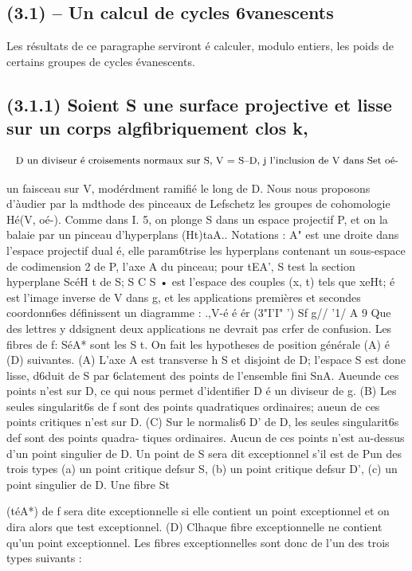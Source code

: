 \documentclass[11pt]{article}
\theoremstyle{remark}
\begin{document}
\subsection*{(3.1) -- Un calcul de cycles 6vanescents}

Les résultats de ce paragraphe serviront é calculer, modulo entiers, les poids de certains groupes de cycles évanescents.

\subsection*{(3.1.1) Soient S une surface projective et lisse sur un corps algfibriquement clos k,}

\[\text{\small D un diviseur é croisements normaux sur S, V = S--D, j l'inclusion de V dans Set oé-}\]

un faisceau sur V, modérdment ramifié le long de D. Nous nous proposons d'àudier par la mdthode des pinceaux de Lefschetz les groupes de cohomologie Hé(V, oé-). Comme dans I. 5, on plonge S dans un espace projectif P, et on la balaie par un pinceau d'hyperplans (Ht)taA.. Notations : A" est une droite dans l'espace projectif dual é, elle param6trise les hyperplans contenant un sous-espace de codimension 2 de P, l'axe A du pinceau; pour tEA', S test la section hyperplane ScéH t de S; S C S • est l'espace des couples (x, t) tels que xeHt; é est l'image inverse de V dans g, et les applications premières et secondes coordonn6es définissent un diagramme : .,V-é é ér (3"I'I" ') Sf g// '1/ A  9 Que des lettres y ddsignent deux applications ne devrait pas crfer de confusion. Les fibres de f: SéA* sont les S t. On fait les hypotheses de position générale (A) é (D) suivantes. (A) L'axe A est transverse h S et disjoint de D; l'espace S est done lisse, d6duit de S par 6clatement des points de l'ensemble fini SnA. Aueunde ces points n'est sur D, ce qui nous permet d'identifier D é un diviseur de g. (B) Les seules singularit6s de f sont des points quadratiques ordinaires; aueun de ces points critiques n'est sur D. (C) Sur le normalis6 D' de D, les seules singularit6s def sont des points quadra- tiques ordinaires. Aucun de ces points n'est au-dessus d'un point singulier de D. Un point de S sera dit exceptionnel s'il est de Pun des trois types (a) un point critique defsur S, (b) un point critique defsur D', (c) un point singulier de D. Une fibre St

(téA*) de f sera dite exceptionnelle si elle contient un point exceptionnel et on dira alors que test exceptionnel. (D) Clhaque fibre exceptionnelle ne contient qu'un point exceptionnel. Les fibres exceptionnelles sont donc de l'un des trois types suivants :
\end{document}
